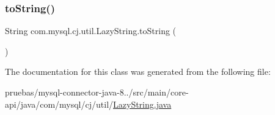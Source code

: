 \mbox{\label{classcom_1_1mysql_1_1cj_1_1util_1_1_lazy_string_a25acdb668b2966e6e99764dd08177869}} 
\subsubsection{\texorpdfstring{to\+String()}{toString()}}
{\footnotesize\ttfamily String com.\+mysql.\+cj.\+util.\+Lazy\+String.\+to\+String (\begin{DoxyParamCaption}{ }\end{DoxyParamCaption})}



The documentation for this class was generated from the following file\+:\begin{DoxyCompactItemize}
\item 
pruebas/mysql-\/connector-\/java-\/8../src/main/core-\/api/java/com/mysql/cj/util/\mbox{\hyperlink{_lazy_string_8java}{Lazy\+String.\+java}}\end{DoxyCompactItemize}
